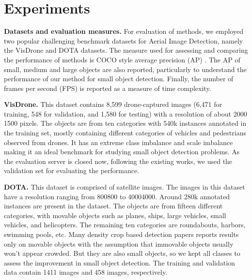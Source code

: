 

\section{Experiments}
\label{sec:experiments}

\noindent \textbf{Datasets and evaluation measures.} For evaluation of methods, we employed two popular challenging benchmark datasets for Aerial Image Detection, namely the VisDrone \cite{zhu-VisDrone-2018} and DOTA \cite{xia-DOTA-2018} datasets. The measure used for assessing and comparing the performance of methods is COCO style average precision (AP) \cite{mscoco-Lin-2014}. The AP of small, medium and large objects are also reported, particularly to understand the performance of our method for small object detection. Finally, the number of frames per second (FPS) is reported as a measure of time complexity.

\noindent \textbf{VisDrone.} This dataset contains  8,599 drone-captured images (6,471
for training, 548 for validation, and 1,580 for testing) with a resolution of about 2000 1500 pixels. The objects are from ten categories with 540k instances annotated in the training set, mostly containing different categories of vehicles and pedestrians observed from drones. It has an extreme class imbalance and scale imbalance making it an ideal benchmark for studying small object detection problems. As the evaluation server is closed now, following the existing works, we used the validation set for evaluating the performance.

\noindent \textbf{DOTA.} This dataset is comprised of satellite images. The images in this dataset have a resolution ranging from 800800 to 40004000. Around 280k annotated instances are present in the dataset. The objects are from fifteen different categories, with movable objects such as planes, ships, large vehicles, small vehicles, and helicopters. The remaining ten categories are roundabouts, harbors, swimming pools, etc. Many density crop based detection papers reports results only on movable objects\cite{clusnet-Yang-2019} with the assumption that immovable objects usually won't appear crowded. But they are also small objects, so we kept all classes to assess the improvement in small object detection. The training and validation data contain 1411 images and 458 images, respectively.

